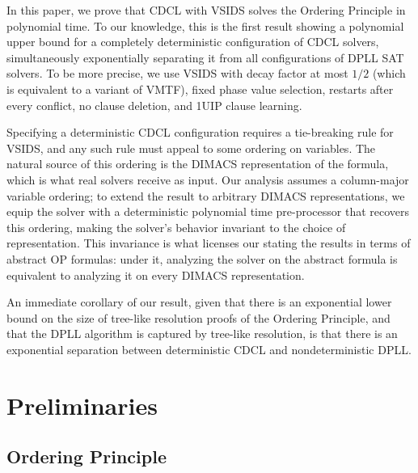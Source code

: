 \documentclass[10pt,a4paper]{article}
\begin{document}
In this paper, we prove that CDCL with VSIDS solves the Ordering Principle in polynomial time. To our knowledge, this is the first result showing a polynomial upper bound for a completely deterministic configuration of CDCL solvers, simultaneously exponentially separating it from all configurations of DPLL SAT solvers. To be more precise, we use VSIDS with decay factor at most $1/2$ (which is equivalent to a variant of VMTF), fixed phase value selection, restarts after every conflict, no clause deletion, and 1UIP clause learning. 

Specifying a deterministic CDCL configuration requires a tie-breaking rule for VSIDS, and any such rule must appeal to some ordering on variables. The natural source of this ordering is the DIMACS representation of the formula, which is what real solvers receive as input. Our analysis assumes a column-major variable ordering; to extend the result to arbitrary DIMACS representations, we equip the solver with a deterministic polynomial time pre-processor that recovers this ordering, making the solver's behavior invariant to the choice of representation. This invariance is what licenses our stating the results in terms of abstract OP formulas: under it, analyzing the solver on the abstract formula is equivalent to analyzing it on every DIMACS representation.

An immediate corollary of our result, given that there is an exponential lower bound on the size of tree-like resolution proofs of the Ordering Principle, and that the DPLL algorithm is captured by tree-like resolution, is that there is an exponential separation between deterministic CDCL and nondeterministic DPLL.
\section{Preliminaries}

\subsection{Ordering Principle}
\end{document}
